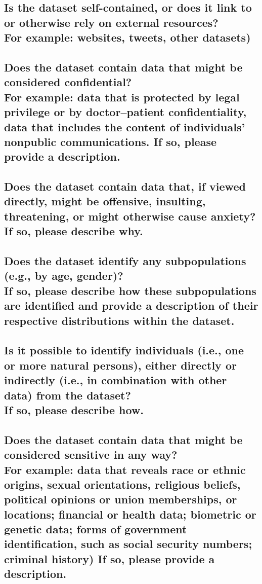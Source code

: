 \documentclass[letterpaper, 10 pt, conference]{ieeeconf}  %
\newcommand{\subtitle}[1]{{\\ \small \normalfont \color{purple} #1}}
\begin{document}
\lipsum[1]

\subsection{Is the dataset self-contained, or does it link to or otherwise rely on external resources? \subtitle{For example: websites, tweets, other datasets)}}

\lipsum[1]

\subsection{Does the dataset contain data that might be considered confidential? \subtitle{For example: data that is protected by legal privilege or by doctor–patient confidentiality, data that includes the content of individuals’ nonpublic communications. If so, please provide a description.}}

\lipsum[1]

\subsection{Does the dataset contain data that, if viewed directly, might be offensive, insulting, threatening, or might otherwise cause anxiety? \subtitle{If so, please describe why.}}

\lipsum[1]

\subsection{Does the dataset identify any subpopulations (e.g., by age, gender)? \subtitle{If so, please describe how these subpopulations are identified and provide a description of their respective distributions within the dataset.}}

\lipsum[1]

\subsection{Is it possible to identify individuals (i.e., one or more natural persons), either directly or indirectly (i.e., in combination with other data) from the dataset? \subtitle{If so, please describe how.}}

\lipsum[1]

\subsection{Does the dataset contain data that might be considered sensitive in any way? \subtitle{For example: data that reveals race or ethnic origins, sexual orientations, religious beliefs, political opinions or union memberships, or locations; financial or health data; biometric or genetic data; forms of government identification, such as social security numbers; criminal history) If so, please provide a description.}}
\end{document}
